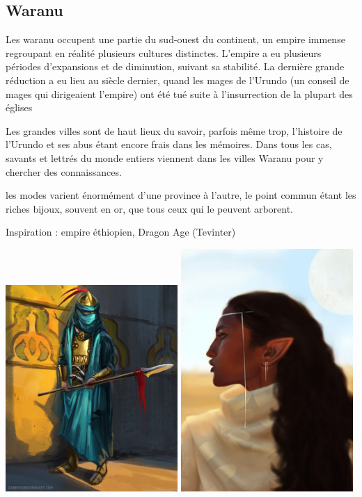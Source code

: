 \documentclass[10pt,a4paper]{book}
\begin{document}
\subsection{Waranu}
Les waranu occupent une partie du sud-ouest du continent, un empire immense regroupant en réalité plusieurs cultures distinctes. L'empire a eu plusieurs périodes d'expansions et de diminution, suivant sa stabilité. La dernière grande réduction a eu lieu au siècle dernier, quand les mages de l'Urundo (un conseil de mages qui dirigeaient l'empire) ont été tué suite à l'insurrection de la plupart des églises

Les grandes villes sont de haut lieux du savoir, parfois même trop, l'histoire de l'Urundo et ses abus étant encore frais dans les mémoires. Dans tous les cas, savants et lettrés du monde entiers viennent dans les villes Waranu pour y chercher des connaissances.

les modes varient énormément d'une province à l'autre, le point commun étant les riches bijoux, souvent en or, que tous ceux qui le peuvent arborent.

Inspiration : empire éthiopien, Dragon Age (Tevinter)

\includegraphics[width=0.49\textwidth]{humain 5}
\includegraphics[width=0.49\textwidth]{elfe 4}
\end{document}
